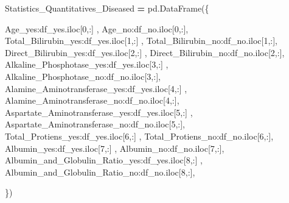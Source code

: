 \documentclass[
  11pt,
  a4paper,
]{article}
\newenvironment{Shaded}{\begin{snugshade}}{\end{snugshade}}
\newcommand{\DecValTok}[1]{\textcolor[rgb]{0.00,0.00,0.81}{#1}}
\newcommand{\NormalTok}[1]{#1}
\newcommand{\OperatorTok}[1]{\textcolor[rgb]{0.81,0.36,0.00}{\textbf{#1}}}
\newcommand{\StringTok}[1]{\textcolor[rgb]{0.31,0.60,0.02}{#1}}
\begin{document}
\begin{Shaded}
\begin{Highlighting}[]
\NormalTok{Statistics\_Quantitatives\_Diseased }\OperatorTok{=}\NormalTok{ pd.DataFrame(\{}
    
              \StringTok{\textquotesingle{}Age\_yes\textquotesingle{}}\NormalTok{:df\_yes.iloc[}\DecValTok{0}\NormalTok{,:]   ,              }
              \StringTok{\textquotesingle{}Age\_no\textquotesingle{}}\NormalTok{:df\_no.iloc[}\DecValTok{0}\NormalTok{,:],}
              \StringTok{\textquotesingle{}Total\_Bilirubin\_yes\textquotesingle{}}\NormalTok{:df\_yes.iloc[}\DecValTok{1}\NormalTok{,:]   , }
              \StringTok{\textquotesingle{}Total\_Bilirubin\_no\textquotesingle{}}\NormalTok{:df\_no.iloc[}\DecValTok{1}\NormalTok{,:],}
              \StringTok{\textquotesingle{}Direct\_Bilirubin\_yes\textquotesingle{}}\NormalTok{:df\_yes.iloc[}\DecValTok{2}\NormalTok{,:]   , }
              \StringTok{\textquotesingle{}Direct\_Bilirubin\_no\textquotesingle{}}\NormalTok{:df\_no.iloc[}\DecValTok{2}\NormalTok{,:],}
              \StringTok{\textquotesingle{}Alkaline\_Phosphotase\_yes\textquotesingle{}}\NormalTok{:df\_yes.iloc[}\DecValTok{3}\NormalTok{,:]   , }
              \StringTok{\textquotesingle{}Alkaline\_Phosphotase\_no\textquotesingle{}}\NormalTok{:df\_no.iloc[}\DecValTok{3}\NormalTok{,:],}
              \StringTok{\textquotesingle{}Alamine\_Aminotransferase\_yes\textquotesingle{}}\NormalTok{:df\_yes.iloc[}\DecValTok{4}\NormalTok{,:]   , }
              \StringTok{\textquotesingle{}Alamine\_Aminotransferase\_no\textquotesingle{}}\NormalTok{:df\_no.iloc[}\DecValTok{4}\NormalTok{,:],}
              \StringTok{\textquotesingle{}Aspartate\_Aminotransferase\_yes\textquotesingle{}}\NormalTok{:df\_yes.iloc[}\DecValTok{5}\NormalTok{,:]   , }
              \StringTok{\textquotesingle{}Aspartate\_Aminotransferase\_no\textquotesingle{}}\NormalTok{:df\_no.iloc[}\DecValTok{5}\NormalTok{,:],}
              \StringTok{\textquotesingle{}Total\_Protiens\_yes\textquotesingle{}}\NormalTok{:df\_yes.iloc[}\DecValTok{6}\NormalTok{,:]   , }
              \StringTok{\textquotesingle{}Total\_Protiens\_no\textquotesingle{}}\NormalTok{:df\_no.iloc[}\DecValTok{6}\NormalTok{,:],}
              \StringTok{\textquotesingle{}Albumin\_yes\textquotesingle{}}\NormalTok{:df\_yes.iloc[}\DecValTok{7}\NormalTok{,:]   , }
              \StringTok{\textquotesingle{}Albumin\_no\textquotesingle{}}\NormalTok{:df\_no.iloc[}\DecValTok{7}\NormalTok{,:],}
              \StringTok{\textquotesingle{}Albumin\_and\_Globulin\_Ratio\_yes\textquotesingle{}}\NormalTok{:df\_yes.iloc[}\DecValTok{8}\NormalTok{,:]   , }
              \StringTok{\textquotesingle{}Albumin\_and\_Globulin\_Ratio\_no\textquotesingle{}}\NormalTok{:df\_no.iloc[}\DecValTok{8}\NormalTok{,:],}
              
\NormalTok{               \})}
\end{Highlighting}
\end{Shaded}
\end{document}
